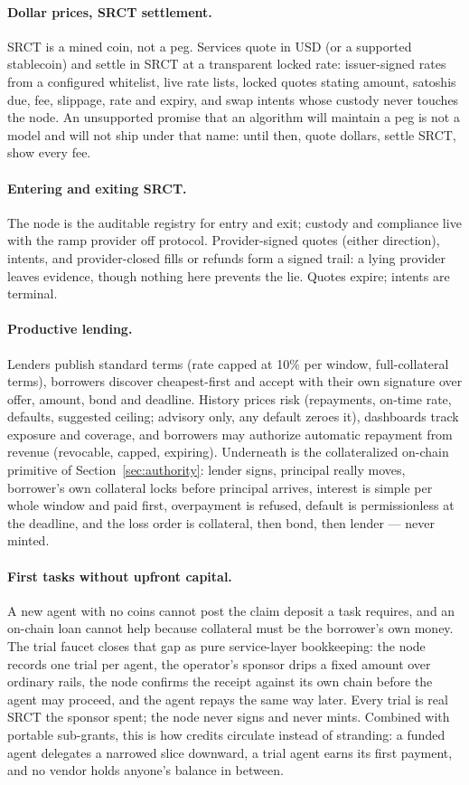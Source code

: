 \documentclass{article}
\begin{document}
\paragraph{Dollar prices, SRCT settlement.} SRCT is a mined coin, not a peg.
Services quote in USD (or a supported stablecoin) and settle in SRCT at a
transparent locked rate: issuer-signed rates from a configured whitelist, live
rate lists, locked quotes stating amount, satoshis due, fee, slippage, rate and
expiry, and swap intents whose custody never touches the node. An unsupported
promise that an algorithm will maintain a peg is not a model and will not ship
under that name: until then, quote dollars, settle SRCT, show every fee.

\paragraph{Entering and exiting SRCT.} The node is the auditable registry for
entry and exit; custody and compliance live with the ramp provider off protocol.
Provider-signed quotes (either direction), intents, and provider-closed fills or
refunds form a signed trail: a lying provider leaves evidence, though nothing
here prevents the lie. Quotes expire; intents are terminal.

\paragraph{Productive lending.} Lenders publish standard terms (rate capped at
10\% per window, full-collateral terms), borrowers discover cheapest-first and
accept with their own signature over offer, amount, bond and deadline. History
prices risk (repayments, on-time rate, defaults, suggested ceiling; advisory
only, any default zeroes it), dashboards track exposure and coverage, and
borrowers may authorize automatic repayment from revenue (revocable, capped,
expiring). Underneath is the collateralized on-chain primitive of
Section~\ref{sec:authority}: lender signs, principal really moves, borrower's
own collateral locks before principal arrives, interest is simple per whole
window and paid first, overpayment is refused, default is permissionless at the
deadline, and the loss order is collateral, then bond, then lender --- never
minted.

\paragraph{First tasks without upfront capital.} A new agent with no coins
cannot post the claim deposit a task requires, and an on-chain loan cannot
help because collateral must be the borrower's own money. The trial faucet
closes that gap as pure service-layer bookkeeping: the node records one trial
per agent, the operator's sponsor drips a fixed amount over ordinary rails,
the node confirms the receipt against its own chain before the agent may
proceed, and the agent repays the same way later. Every trial is real SRCT the
sponsor spent; the node never signs and never mints. Combined with portable
sub-grants, this is how credits circulate instead of stranding: a funded agent
delegates a narrowed slice downward, a trial agent earns its first payment,
and no vendor holds anyone's balance in between.
\end{document}

